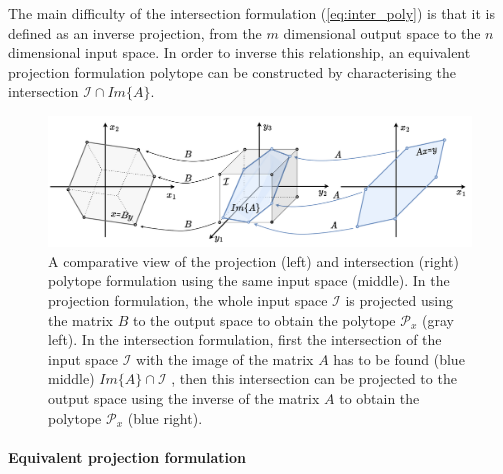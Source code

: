 The main difficulty of the intersection formulation (\ref{eq:inter_poly}) is that it is defined as an inverse projection, from the $m$ dimensional output space to the $n$ dimensional input space\cite{LARSON2013}. In order to inverse this relationship, an equivalent projection formulation polytope can be constructed by characterising the intersection $\mathcal{I}\cap Im\{A\}$. 

\begin{figure}
    \centering
    \includegraphics[width=\linewidth]{Chapters/imgs/intersection_projection.pdf}
    \caption{A comparative view of the projection (left) and intersection (right) polytope formulation using the same input space (middle). In the projection formulation, the whole input space $\mathcal{I}$ is projected using the matrix $B$ to the output space to obtain the polytope $\mathcal{P}_x$ (gray left). In the intersection formulation, first the intersection of the input space $\mathcal{I}$ with the image of the matrix $A$ has to be found (blue middle) $Im\{A\} \cap \mathcal{I}$ , then this intersection can be projected to the output space using the inverse of the matrix $A$ to obtain the polytope $\mathcal{P}_x$ (blue right).}
    \label{fig:inter_proj}
\end{figure}


\paragraph*{Equivalent projection formulation} 




